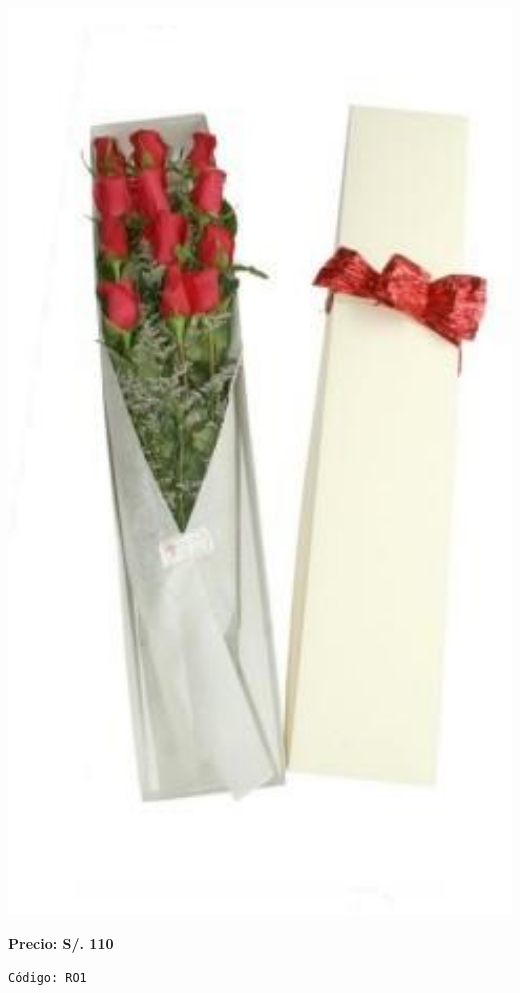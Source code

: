 \documentclass[12pt]{article}
\begin{document}
\begin{minipage}{0.35\textwidth}
    \includegraphics[width=1.0\textwidth]{imagenes_extraidas/image_5_3}
\end{minipage}
\vspace{0.3cm}
\begin{center}
   \textbf{\Large Precio: \textcolor[HTML]{228B22}{S/. 110 }}
\end{center}
\begin{center}
    \textcolor[HTML]{191970}{\texttt{Código: RO1}}
\end{center}
\end{document}
